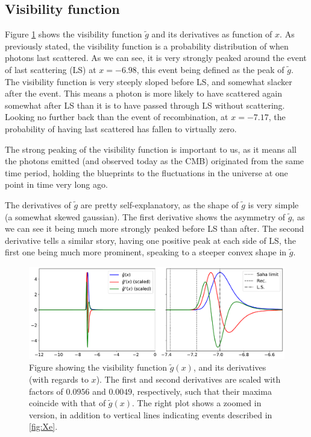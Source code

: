 \documentclass[10pt, a4paper]{article}
\begin{document}
\subsection{Visibility function}\label{sec:results:g_tilde}
Figure \ref{fig:g_tilde} shows the visibility function $\tilde{g}$ and its derivatives as function of $x$. As previously stated, the visibility function is a probability distribution of when photons last scattered. As we can see, it is very strongly peaked around the event of last scattering (LS) at $x = -6.98$, this event being defined as the peak of $\tilde{g}$. The visibility function is very steeply sloped before LS, and somewhat slacker after the event. This means a photon is more likely to have scattered again somewhat after LS than it is to have passed through LS without scattering. Looking no further back than the event of recombination, at $x = -7.17$, the probability of having last scattered has fallen to virtually zero.

The strong peaking of the visibility function is important to us, as it means all the photons emitted (and observed today as the CMB) originated from the same time period, holding the blueprints to the fluctuations in the universe at one point in time very long ago.

The derivatives of $\tilde{g}$ are pretty self-explanatory, as the shape of $\tilde{g}$ is very simple (a somewhat skewed gaussian). The first derivative shows the asymmetry of $\tilde{g}$, as we can see it being much more strongly peaked before LS than after. The second derivative tells a similar story, having one positive peak at each side of LS, the first one being much more prominent, speaking to a steeper convex shape in $\tilde{g}$.


\begin{figure}[H]
    \centering
    \includegraphics[scale=0.5]{../m2_figs/g_tilde.pdf}
    \caption{Figure showing the visibility function $\tilde{g}(x)$, and its derivatives (with regards to $x$). The first and second derivatives are scaled with factors of $0.0956$ and $0.0049$, respectively, such that their maxima coincide with that of $\tilde{g}(x)$. The right plot shows a zoomed in version, in addition to vertical lines indicating events described in \ref{fig:Xe}.}
    \label{fig:g_tilde}
\end{figure}
\end{document}
